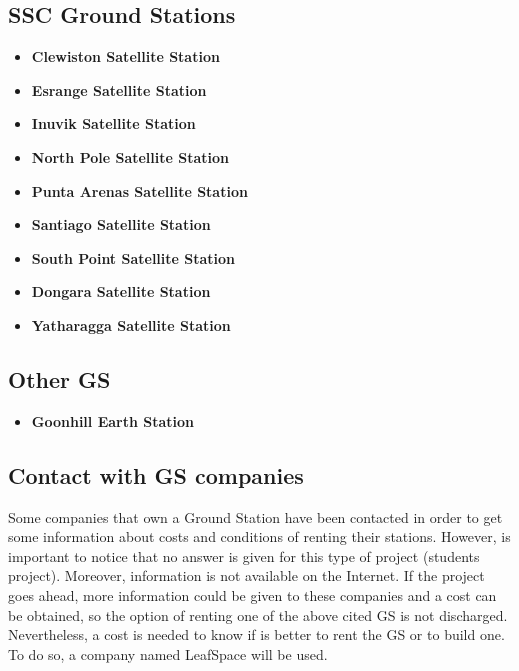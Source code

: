\subsection{SSC Ground Stations}
\begin{itemize}
\item \textbf{Clewiston Satellite Station}

\item \textbf{Esrange Satellite Station}

\item \textbf{Inuvik Satellite Station}

\item \textbf{North Pole Satellite Station}

\item \textbf{Punta Arenas Satellite Station}

\item \textbf{Santiago Satellite Station}

\item \textbf{South Point Satellite Station}

\item \textbf{Dongara Satellite Station}

\item \textbf{Yatharagga Satellite Station}

\end{itemize}
\subsection{Other GS}
\begin{itemize}
\item \textbf{Goonhill Earth Station}

\end{itemize}
\subsection{Contact with GS companies}
Some companies that own a Ground Station have been contacted in order to get some information about costs and conditions of renting their stations. However, is important to notice that no answer is given for this type of project (students project). Moreover, information is not available on the Internet. If the project goes ahead, more information could be given to these companies and a cost can be obtained, so the option of renting one of the above cited GS is not discharged. Nevertheless, a cost is needed to know if is better to rent the GS or to build one. To do so, a company named LeafSpace will be used.
